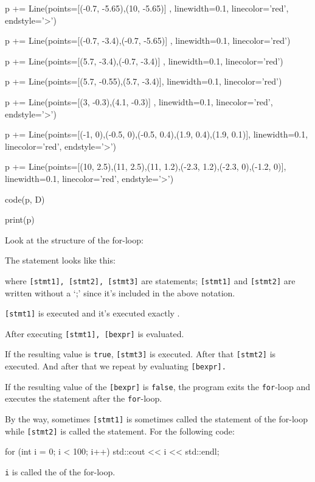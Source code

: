 \begin{python}
p += Line(points=[(-0.7, -5.65),(10, -5.65)] , linewidth=0.1, linecolor='red', endstyle='>')

p += Line(points=[(-0.7, -3.4),(-0.7, -5.65)] , linewidth=0.1, linecolor='red')

p += Line(points=[(5.7, -3.4),(-0.7, -3.4)] , linewidth=0.1, linecolor='red')

p += Line(points=[(5.7, -0.55),(5.7, -3.4)], linewidth=0.1, linecolor='red')

p += Line(points=[(3, -0.3),(4.1, -0.3)] , linewidth=0.1, linecolor='red', endstyle='>')

p += Line(points=[(-1, 0),(-0.5, 0),(-0.5, 0.4),(1.9, 0.4),(1.9, 0.1)], linewidth=0.1, linecolor='red', endstyle='>')

p += Line(points=[(10, 2.5),(11, 2.5),(11, 1.2),(-2.3, 1.2),(-2.3, 0),(-1.2, 0)], linewidth=0.1, linecolor='red', endstyle='>')


code(p, D)

print(p)
\end{python}

Look at the structure of the for-loop:

The statement looks like this:
\begin{center}
\tab[1em]{\EMPHASIZE{\texttt{[stmt3]}}}
\end{center}
where \texttt{[stmt1], [stmt2], [stmt3]} are statements; \texttt{[stmt1]} and \texttt{[stmt2]} are written without a `;' since it's included in the above notation.

\texttt{[stmt1]} is executed  and it's executed exactly .

After executing \texttt{[stmt1], [bexpr]} is evaluated.

If the resulting value is \texttt{true}, \texttt{[stmt3]} is executed.
After that \texttt{[stmt2]} is executed. And after that we repeat by
evaluating \texttt{[bexpr].}

If the resulting value of the \texttt{[bexpr]} is \texttt{false}, the
program exits the \texttt{for}-loop and executes the statement after the
\texttt{for}-loop.

By the way, sometimes \texttt{[stmt1]} is sometimes called the  statement of the for-loop while \texttt{[stmt2]} is called the  statement. For the following code:
\begin{console}
for (int i = 0; i < 100; i++)
{   
    std::cout << i << std::endl;
}
\end{console}
\texttt{i} is called the  of the
for-loop.

